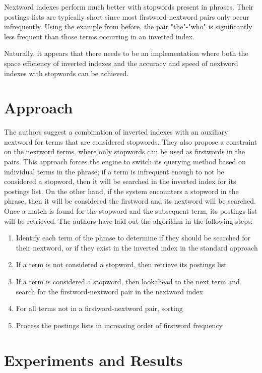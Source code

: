\documentclass[11pt]{article}
\begin{document}
    Nextword indexes perform much better with stopwords present in phrases. Their postings lists are typically short since most firstword-nextword pairs only occur infrequently. Using the example from before, the pair "the"-"who" is significantly less frequent than those terms occurring in an inverted index.

    Naturally, it appears that there needs to be an implementation where both the space efficiency of inverted indexes and the accuracy and speed of nextword indexes with stopwords can be achieved.

    \section*{Approach}

    The authors suggest a combination of inverted indexes with an auxiliary nextword for terms that are considered stopwords. They also propose a constraint on the nextword terms, where only stopwords can be used as firstwords in the pairs. This approach forces the engine to switch its querying method based on individual terms in the phrase; if a term is infrequent enough to not be considered a stopword, then it will be searched in the inverted index for its postings list. On the other hand, if the system encounters a stopword in the phrase, then it will be considered the firstword and its nextword will be searched. Once a match is found for the stopword and the subsequent term, its postings list will be retrieved. The authors have laid out the algorithm in the following steps:

    \begin{enumerate}
        \item Identify each term of the phrase to determine if they should be searched for their nextword, or if they exist in the inverted index in the standard approach
        \item If a term is not considered a stopword, then retrieve its postings list
        \item If a term is considered a stopword, then lookahead to the next term and search for the firstword-nextword pair in the nextword index
        \item For all terms not in a firstword-nextword pair, sorting
        \item Process the postings lists in increasing order of firstword frequency
    \end{enumerate}

    \section*{Experiments and Results}
\end{document}
